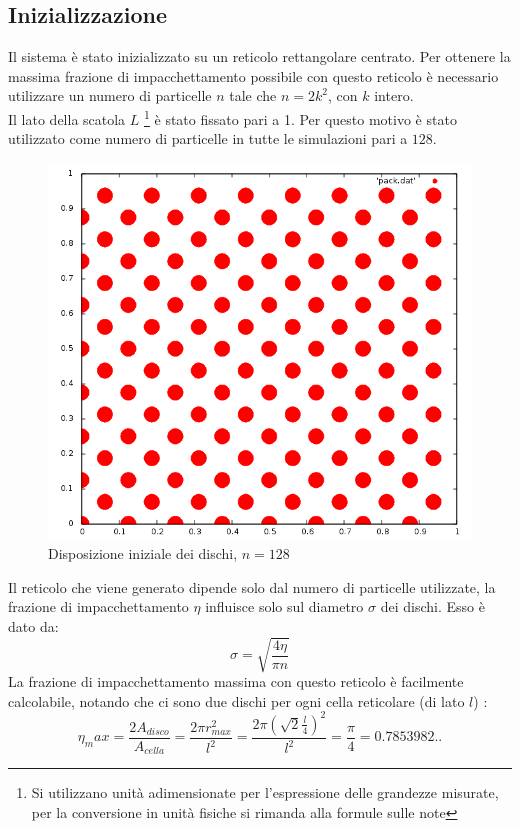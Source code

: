 \subsection{Inizializzazione}
Il sistema è stato inizializzato su un reticolo rettangolare centrato.
Per ottenere la massima frazione di impacchettamento possibile con questo reticolo è necessario utilizzare un numero di particelle $n$ tale che $ n = 2k^2$, con $k$ intero.\\
Il lato della scatola $L$ \footnote{Si utilizzano unità adimensionate per l'espressione delle grandezze misurate, per la conversione in unità fisiche si rimanda alla formule sulle note} è stato fissato pari a 1.
Per questo motivo è stato utilizzato come numero di particelle in tutte le simulazioni pari a $128$.
\begin{figure}[h]
	\centering
	\includegraphics[scale=0.5]{sfere2D/reticolo.png}
	\caption{Disposizione iniziale dei dischi, $n=128$}
\end{figure}
Il reticolo che viene generato dipende solo dal numero di particelle utilizzate, la frazione di impacchettamento $\eta$ influisce solo sul diametro $\sigma$ dei dischi. Esso è dato da:
$$
	\sigma = \sqrt{\frac{4 \eta}{ \pi n}}
$$
La frazione di impacchettamento massima con questo reticolo è facilmente calcolabile, notando che ci sono due dischi per ogni cella reticolare (di lato $l$) :
$$
	\eta_max = \frac{ 2 A_{disco}}{A_{cella}} = \frac{2 \pi r_{max}^2}{l^2} = \frac{2 \pi (\sqrt{2} \frac{l}{4})^2}{l^2} = \frac{\pi}{4} = 0.7853982..
$$
